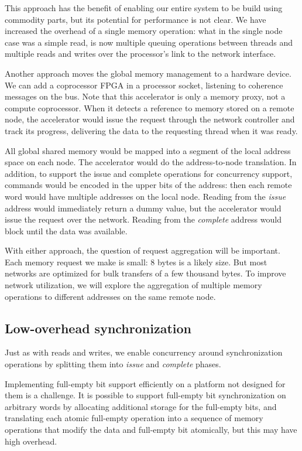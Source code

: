 \documentclass[10pt,nocopyrightspace,preprint]{sigplanconf}
\begin{document}
This approach has the benefit of enabling our entire system to be
build using commodity parts, but its potential for performance is not
clear. We have increased the overhead of a single memory operation:
what in the single node case was a simple read, is now multiple
queuing operations between threads and multiple reads and writes over
the processor's link to the network interface.

Another approach moves the global memory management to a hardware
device. We can add a coprocessor FPGA in a processor socket, listening
to coherence messages on the bus. Note that this accelerator is only a
memory proxy, not a compute coprocessor. When it detects a reference
to memory stored on a remote node, the accelerator would issue the
request through the network controller and track its progress,
delivering the data to the requesting thread when it was ready.

All global shared memory would be mapped into a segment of the local
address space on each node. The accelerator would do the
address-to-node translation. In addition, to support the issue and
complete operations for concurrency support, commands would be encoded
in the upper bits of the address: then each remote word would have multiple
addresses on the local node. Reading from the {\em issue} address would
immediately return a dummy value, but the accelerator would issue the
request over the network. Reading from the {\em complete} address
would block until the data was available.

With either approach, the question of request aggregation will be
important. Each memory request we make is small: 8 bytes is a likely
size. But most networks are optimized for bulk transfers of a few
thousand bytes. To improve network utilization, we will explore the
aggregation of multiple memory operations to different addresses on
the same remote node. 


\subsection{Low-overhead synchronization}

Just as with reads and writes, we enable concurrency around
synchronization operations by splitting them into {\em issue} and {\em
  complete} phases.

Implementing full-empty bit support efficiently on a platform not
designed for them is a challenge. It is possible to support full-empty
bit synchronization on arbitrary words by allocating additional
storage for the full-empty bits, and translating each atomic
full-empty operation into a sequence of memory operations that modify
the data and full-empty bit atomically, but this may have high
overhead. 
\end{document}
